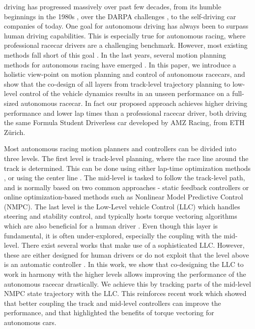  driving has progressed massively over past few decades, from its humble beginnings in the 1980s \cite{dickmanns1987,Pomerleau1989}, over the DARPA challenges \cite{buehler2005,buehler2009}, to the self-driving car companies of today. One goal for autonomous driving has always been to surpass human driving capabilities. This is especially true for autonomous racing, where professional racecar drivers are a challenging benchmark.
However, most existing methods fall short of this goal \cite{hermansdorfer2020benchmarking}.
In the last years, several motion planning methods for autonomous racing have emerged \cite{Gerdes2012,Liniger2015}. In this paper, we introduce a holistic view-point on motion planning and control of autonomous racecars, and show that the co-design of all layers from track-level trajectory planning to low-level control of the vehicle dynamics results in an unseen performance on a full-sized autonomous racecar. In fact our proposed approach achieves higher driving performance and lower lap times than a professional racecar driver, both driving the same Formula Student Driverless car developed by AMZ Racing, from ETH Z\"urich.

Most autonomous racing motion planners and controllers can be divided into three levels. The first level is track-level planning, where the race line around the track is determined. This can be done using either lap-time optimization methods \cite{lot2014curvilinear,Rucco2015,vazquez2020optimization}, or using the center line \cite{Liniger2015,Kabzan2019_AMZ,Rosolia2017}. The mid-level is tasked to follow the track-level path, and is normally based on two common approaches - static feedback controllers \cite{Gerdes2012,Betz2019,TALVALA2011137} or online optimization-based methods \cite{Liniger2015,funke2016collision,caporale2019towards,williams2016aggressive} such as Nonlinear Model Predictive Control (NMPC). The last level is the Low-Level vehicle Control (LLC) which handles steering and stability control, and typically hosts torque vectoring algorithms which are also beneficial for a human driver \cite{human_llc}.
Even though this layer is fundamental, it is often under-explored, especially the coupling with the mid-level.
There exist several works that make use of a sophisticated LLC. However, these are either designed for human drivers \cite{Kabzan2019_AMZ,vazquez2020optimization} or do not exploit that the level above is an automatic controller \cite{TALVALA2011137,Chatzikomis_2018}. 
In this work, we show that co-designing the LLC to work in harmony with the higher levels allows improving the performance of the autonomous racecar drastically. We achieve this by tracking parts of the mid-level NMPC state trajectory with the LLC. This reinforces recent work which showed that better coupling the track and mid-level controllers \cite{vazquez2020optimization,Novi2019} can improve the performance, and \cite{Chatzikomis_2018} that highlighted the benefits of torque vectoring for autonomous cars. 


